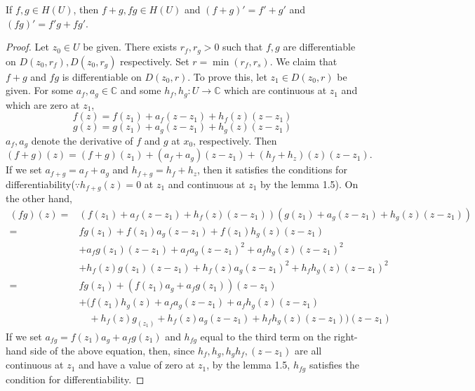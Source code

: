 \documentclass{article}
\begin{document}
\begin{multicols}{2}
\begin{exersise}
[Lemma 1.10]
If $f,g\in H(U)$, then $f+g,fg\in H(U)$ and $(f+g)'=f'+g'$ and $(fg)'=f'g+fg'$. 
\end{exersise}
\begin{proof}
Let $z_0\in U$ be given. There exists $r_f,r_g>0$ such that $f,g$ are differentiable on $D(z_0,r_f),D(z_0,r_g)$ respectively. Set $r=\min(r_f,r_s)$. We claim that $f+g$ and $fg$ is differentiable on $D(z_0,r)$. To prove this, let $z_1\in D(z_0,r)$ be given. 
For some $a_f,a_g\in \mathbb{C}$ and some $h_f,h_g:U\to \mathbb{C}$ which are continuous at $z_1$ and which are zero at $z_1$,
$$f(z) = f(z_1)+a_f(z-z_1)+h_f(z)(z-z_1)$$
$$g(z) = g(z_1)+a_g(z-z_1)+h_g(z)(z-z_1)$$
$a_f,a_g$ denote the derivative of $f$ and $g$ at $x_0$, respectively.
Then
$$(f+g)(z)= (f+g)(z_1)+(a_f+a_g)(z-z_1)+(h_f+h_z)(z)(z-z_1).$$
If we set $a_{f+g}=a_f+a_g$ and $h_{f+g}=h_f+h_z$, then it satisfies the conditions for differentiability($\because h_{f+g}(z) = 0$ at $z_1$ and continuous at $z_1$ by the lemma 1.5). On the other hand,
\begin{align*}
    (fg)(z) =& (f(z_1)+a_f(z-z_1)+h_f(z)(z-z_1))(g(z_1)+a_g(z-z_1)+h_g(z)(z-z_1))\\
    =& fg(z_1)+f(z_1)a_g(z-z_1)+f(z_1)h_g(z)(z-z_1)\\
    &+a_fg(z_1)(z-z_1)+a_fa_g(z-z_1)^2+a_fh_g(z)(z-z_1)^2\\
    &+h_f(z)g(z_1)(z-z_1)+h_f(z)a_g(z-z_1)^2+h_fh_g(z)(z-z_1)^2\\
    =& fg(z_1)+(f(z_1)a_g+a_fg(z_1))(z-z_1)\\
    &+ (f(z_1)h_g(z)+a_fa_g(z-z_1)+a_fh_g(z)(z-z_1)\\
    &\quad +h_f(z)g_(z_1)+h_f(z)a_g(z-z_1)+h_fh_g(z)(z-z_1))(z-z_1)
\end{align*}
If we set $a_{fg}=f(z_1)a_g+a_fg(z_1)$ and $h_{fg}$ equal to the third term on the right-hand side of the above equation, then, since $h_f, h_g, h_gh_f, (z-z_1)$ are all continuous at $z_1$ and have a value of zero at $z_1$, by the lemma 1.5, $h_{fg}$ satisfies the condition for differentiability.
\end{proof}


\end{multicols}
\end{document}
